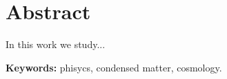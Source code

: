 \chapter*{Abstract}

In this work we study... 
\vspace{1.5cm}

{\bf Keywords:} phisycs, condensed matter, cosmology.
